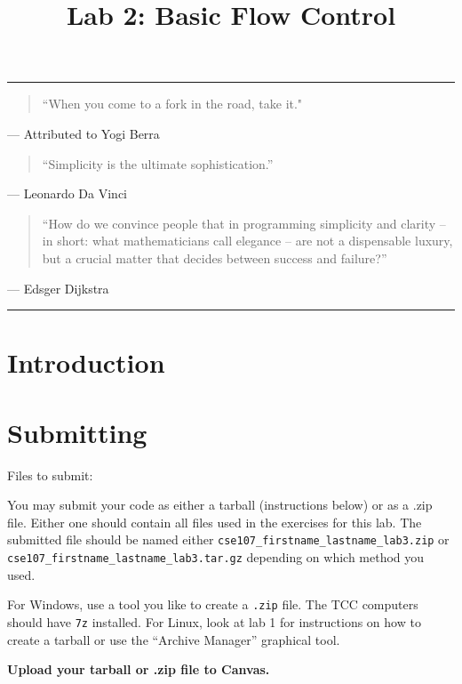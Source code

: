 \documentclass[11pt]{cselabheader}
\title{Lab 2: Basic Flow Control}
\begin{document}
\maketitle

\hrule

\begin{quotation}
``When you come to a fork in the road, take it."
\end{quotation}
\begin{flushright}
--- Attributed to Yogi Berra
\end{flushright}

\begin{quotation}
``Simplicity is the ultimate sophistication.''
\end{quotation}
\begin{flushright}
--- Leonardo Da Vinci
\end{flushright}

\begin{quotation}
``How do we convince people that in programming simplicity and clarity -- in
short: what mathematicians call elegance -- are not a dispensable luxury, but
a crucial matter that decides between success and failure?''
\end{quotation}
\begin{flushright}
--- Edsger Dijkstra
\end{flushright}

\hrule

\section{Introduction}


\pagebreak
\section{Submitting}

Files to submit:
\begin{itemize}
\end{itemize}

You may submit your code as either a tarball (instructions below) or as a .zip
file. Either one should contain all files used in the exercises for this lab.
The submitted file should be named either
\texttt{cse107\_firstname\_lastname\_lab3.zip} or
\texttt{cse107\_firstname\_lastname\_lab3.tar.gz} depending on which method you
used.

For Windows, use a tool you like to create a \texttt{.zip} file. The TCC computers should
have \texttt{7z} installed. For Linux, look at lab 1 for instructions on how to
create a tarball or use the ``Archive Manager'' graphical tool.

\begin{center}
  \textbf{Upload your tarball or .zip file to Canvas.}
\end{center}
\end{document}
